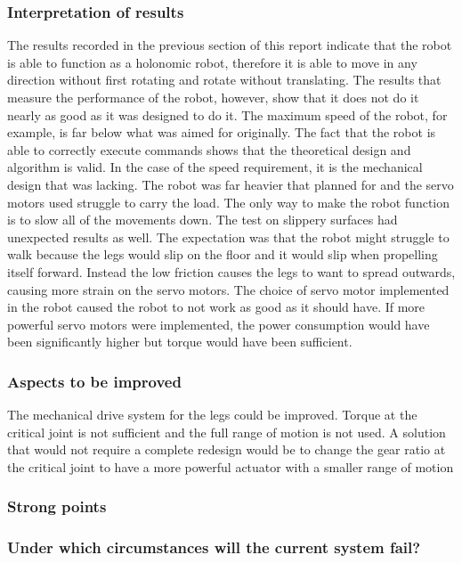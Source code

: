 \newpage
\subsubsection{Interpretation of results}
The results recorded in the previous section of this report indicate that the robot is able to function as a holonomic robot, therefore it is able to move in any direction without first rotating and rotate without translating. The results that measure the performance of the robot, however, show that it does not do it nearly as good as it was designed to do it. The maximum speed of the robot, for example, is far below what was aimed for originally. The fact that the robot is able to correctly execute commands shows that the theoretical design and algorithm is valid. In the case of the speed requirement, it is the mechanical design that was lacking. The robot was far heavier that planned for and the servo motors used struggle to carry the load. The only way to make the robot function is to slow all of the movements down. The test on slippery surfaces had unexpected results as well. The expectation was that the robot might struggle to walk because the legs would slip on the floor and it would slip when propelling itself forward. Instead the low friction causes the legs to want to spread outwards, causing more strain on the servo motors. The choice of servo motor implemented in the robot caused the robot to not work as good as it should have. If more powerful servo motors were implemented, the power consumption would have been significantly higher but torque would have been sufficient.  

\subsubsection{Aspects to be improved}
The mechanical drive system for the legs could be improved. Torque at the critical joint is not sufficient and the full range of motion is not used. A solution that would not require a complete redesign would be to change the gear ratio at the critical joint to have a more powerful actuator with a smaller range of motion

\subsubsection{Strong points}

\subsubsection{Under which circumstances will the current system fail?}

